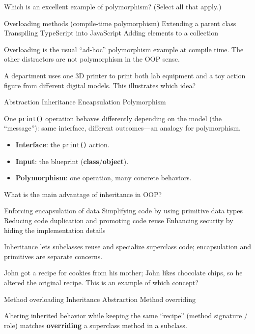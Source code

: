 \question[4]
Which is an excellent example of polymorphism? (Select all that apply.)
\begin{checkboxes}
  \CorrectChoice Overloading methods (compile-time polymorphism)
  \choice Extending a parent class
  \choice Transpiling TypeScript into JavaScript
  \choice Adding elements to a collection
\end{checkboxes}
\begin{solution}
  Overloading is the usual ``ad-hoc'' polymorphism example at compile time. The other distractors are not polymorphism in the OOP sense.
\end{solution}

\question[4]
A department uses one 3D printer to print both lab equipment and a toy action figure from different digital models. This illustrates which idea?
\begin{choices}
  \choice Abstraction
  \choice Inheritance
  \choice Encapsulation
  \CorrectChoice Polymorphism
\end{choices}
\begin{solution}
  One \texttt{print()} operation behaves differently depending on the model (the ``message''): same interface, different outcomes---an analogy for polymorphism.

  \begin{itemize}
    \item \textbf{Interface}: the \texttt{print()} action.
    \item \textbf{Input}: the blueprint (\textbf{class}/\textbf{object}).
    \item \textbf{Polymorphism}: one operation, many concrete behaviors.
  \end{itemize}
\end{solution}

\newpage

\question[4]
What is the main advantage of inheritance in OOP?
\begin{choices}
  \choice Enforcing encapsulation of data
  \choice Simplifying code by using primitive data types
  \CorrectChoice Reducing code duplication and promoting code reuse
  \choice Enhancing security by hiding the implementation details
\end{choices}
\begin{solution}
  Inheritance lets subclasses reuse and specialize superclass code; encapsulation and primitives are separate concerns.
\end{solution}

\question[4]
John got a recipe for cookies from his mother; John likes chocolate chips, so he altered the original recipe. This is an example of which concept?
\begin{choices}
  \choice Method overloading
  \choice Inheritance
  \choice Abstraction
  \CorrectChoice Method overriding
\end{choices}
\begin{solution}
  Altering inherited behavior while keeping the same ``recipe'' (method signature / role) matches \textbf{overriding} a superclass method in a subclass.
\end{solution}


